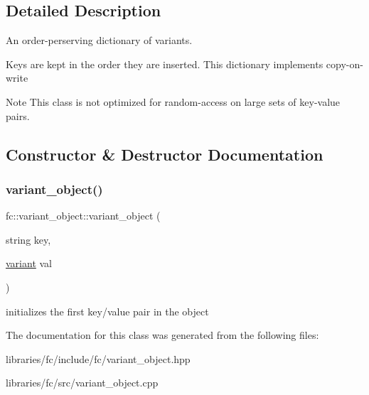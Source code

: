 \subsection{Detailed Description}
An order-\/perserving dictionary of variant\textquotesingle{}s. 

Keys are kept in the order they are inserted. This dictionary implements copy-\/on-\/write

\begin{DoxyNote}{Note}
This class is not optimized for random-\/access on large sets of key-\/value pairs. 
\end{DoxyNote}


\subsection{Constructor \& Destructor Documentation}
\mbox{\label{classfc_1_1variant__object_adf9035916f5395ac5858746b83ce6032}} 
\subsubsection{\texorpdfstring{variant\+\_\+object()}{variant\_object()}}
{\footnotesize\ttfamily fc\+::variant\+\_\+object\+::variant\+\_\+object (\begin{DoxyParamCaption}\item[{string}]{key,  }\item[{\mbox{\hyperlink{classfc_1_1variant}{variant}}}]{val }\end{DoxyParamCaption})}

initializes the first key/value pair in the object 

The documentation for this class was generated from the following files\+:\begin{DoxyCompactItemize}
\item 
libraries/fc/include/fc/variant\+\_\+object.\+hpp\item 
libraries/fc/src/variant\+\_\+object.\+cpp\end{DoxyCompactItemize}
